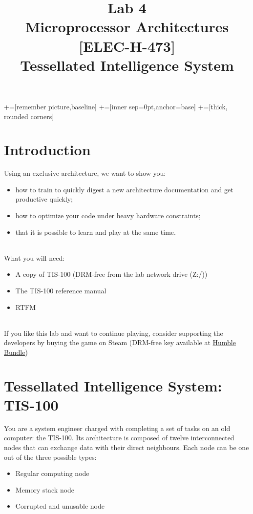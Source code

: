 \documentclass[10pt,a4paper]{article}
\date{\vspace{-1cm}\version}
\title{\vspace{-2cm} Lab 4\\ Microprocessor Architectures [ELEC-H-473]\\ Tessellated Intelligence System \ifthenelse{\boolean{corrige}}{~\\Corrigé}{}}
\theoremstyle{definition}%
\begin{document}
\newcommand\tabnode[1]{\addtocounter{nodecount}{1} \tikz \node (\arabic{nodecount}) {#1};}

+=[remember picture,baseline]
+=[inner sep=0pt,anchor=base]
+=[thick, rounded corners]



\maketitle
\section*{Introduction}

Using an exclusive architecture, we want to show you:
\begin{itemize}
\item how to train to quickly digest a new architecture documentation and get productive quickly;
\item how to optimize your code under heavy hardware constraints;
\item that it is possible to learn and play at the same time.
\end{itemize}
~\\

What you will need:
\begin{itemize}
\item A copy of TIS-100 (DRM-free from the lab network drive (Z:/))
\item The TIS-100 reference manual
\item RTFM
\end{itemize}
~\\
If you like this lab and want to continue playing, consider supporting the developers by buying the game on Steam (DRM-free key available at \href{https://www.humblebundle.com/store/tis100}{Humble Bundle})

\section{Tessellated Intelligence System: TIS-100}
You are a system engineer charged with completing a set of tasks on an old computer: the TIS-100.
Its architecture is composed of twelve interconnected nodes that can exchange data with their direct neighbours.
Each node can be one out of the three possible types: 
\begin{itemize}
	\item Regular computing node
	\item Memory stack node
	\item Corrupted and unusable node
\end{itemize}
\end{document}
